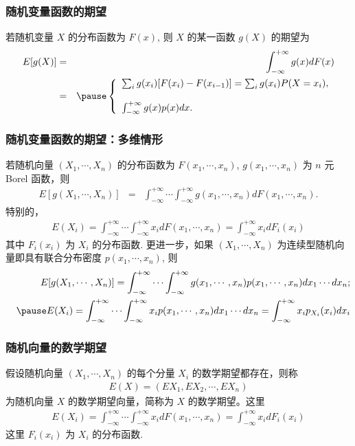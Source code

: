 	\begin{frame}
		\frametitle{随机变量函数的期望}
		\begin{thm}
			若随机变量 $X$ 的分布函数为 $F (x)$, 则 $X$ 的某一函数 $g (X)$ 的期望为
			\begin{eqnarray*}
				E[g(X)]&=&\int_{-\infty}^{+\infty}g(x)dF(x)\\
				&=&\pause \left\{
				\begin{array}{l}
					\sum_{i}g(x_i)[F(x_i)-F(x_{i-1})]=\sum_{i}g(x_i)P(X=x_i),\\
					\\
					\int_{-\infty}^{+\infty}g(x)p(x)dx.
				\end{array}
				\right.
			\end{eqnarray*}

		\end{thm}
	\end{frame}
	\begin{frame}
		\frametitle{随机变量函数的期望：多维情形}
		\begin{thm}
			若随机向量 $(X_1,\cdots, X_n)$ 的分布函数为 $F (x_1,\cdots,x_n)$, $g (x_1,\cdots, x_n)$ 为 $n$ 元 Borel 函数，则
			\begin{eqnarray*}
				E[g(X_1,\cdots, X_n)]&=&\int_{-\infty}^{+\infty}\cdots\int_{-\infty}^{+\infty}g(x_1,\cdots,x_n)dF(x_1,\cdots,x_n).
			\end{eqnarray*}
			特别的，\pause
			\begin{eqnarray*}
				E(X_i)=\int_{-\infty}^{+\infty}\cdots\int_{-\infty}^{+\infty}x_idF(x_1,\cdots,x_n)=\int_{-\infty}^{+\infty}x_idF_i(x_i)
			\end{eqnarray*}
			其中 $F_i (x_i)$ 为 $X_i$ 的分布函数. \pause 更进一步，如果 $(X_1,\cdots,X_n)$ 为连续型随机向量即具有联合分布密度 $p (x_1,\cdots,x_n)$, 则 \pause
			\begin{eqnarray*}
				&&E[g(X_1,\cdots, X_n)]=\int_{-\infty}^{+\infty}\cdots\int_{-\infty}^{+\infty}g(x_1,\cdots,x_n)p(x_1,\cdots,x_n)dx_1\cdots dx_n;\\
				&&\pause E(X_i)=\int_{-\infty}^{+\infty}\cdots\int_{-\infty}^{+\infty}x_ip(x_1,\cdots,x_n)dx_1\cdots dx_n=\int_{-\infty}^{+\infty}x_ip_{X_i}(x_i)dx_i
			\end{eqnarray*}
		\end{thm}
	\end{frame}
	\begin{frame}
		\frametitle{随机向量的数学期望}
		\begin{defi}
			假设随机向量 $(X_1,\cdots, X_n)$ 的每个分量 $X_i$ 的数学期望都存在，则称
			\begin{eqnarray*}
				E(X)=(EX_1,EX_2,\cdots,EX_n)
			\end{eqnarray*}
			为随机向量 $X$ 的数学期望向量，简称为 $X$ 的数学期望。这里
			\begin{eqnarray*}
				E(X_i)=\int_{-\infty}^{+\infty}\cdots\int_{-\infty}^{+\infty}x_idF(x_1,\cdots,x_n)=\int_{-\infty}^{+\infty}x_idF_i(x_i)
			\end{eqnarray*}
			这里 $F_i (x_i)$ 为 $X_i$ 的分布函数.

		\end{defi}

	\end{frame}

